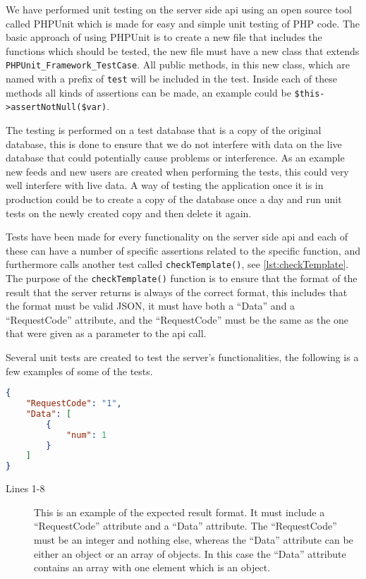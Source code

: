 We have performed unit testing on the server side \ac{api} using an open source tool called PHPUnit which is made for easy and simple unit testing of PHP code. The basic approach of using PHPUnit is to create a new file that includes the functions which should be tested, the new file must have a new class that extends \lstinline|PHPUnit_Framework_TestCase|. All public methods, in this new class, which are named with a prefix of \lstinline|test| will be included in the test. Inside each of these methods all kinds of assertions can be made, an example could be \lstinline|$this->assertNotNull($var)|\citep{phpunit}.

The testing is performed on a test database that is a copy of the original database, this is done to ensure that we do not interfere with data on the live database that could potentially cause problems or interference. As an example new feeds and new users are created when performing the tests, this could very well interfere with live data. A way of testing the application once it is in production could be to create a copy of the database once a day and run unit tests on the newly created copy and then delete it again.

Tests have been made for every functionality on the server side \ac{api} and each of these can have a number of specific assertions related to the specific function, and furthermore calls another test called \lstinline|checkTemplate()|, see \autoref{lst:checkTemplate}. The purpose of the \lstinline|checkTemplate()| function is to ensure that the format of the result that the server returns is always of the correct format, this includes that the format must be valid JSON, it must have both a ``Data'' and a ``RequestCode'' attribute, and the ``RequestCode'' must be the same as the one that were given as a parameter to the \ac{api} call.

Several unit tests are created to test the server's functionalities, the following is a few examples of some of the tests.

\begin{lstlisting}[language=json, label=lst:jsonFormat, caption={JSON format, in this case an example of the result from \lstinline|CheckFeeds|}]
{
    "RequestCode": "1",
    "Data": [
        {
            "num": 1
        }
    ]
}
\end{lstlisting}
\begin{description}
\item[Lines 1-8] This is an example of the expected result format. It must include a ``RequestCode'' attribute and a ``Data'' attribute. The ``RequestCode'' must be an integer and nothing else, whereas the ``Data'' attribute can be either an object or an array of objects. In this case the ``Data'' attribute contains an array with one element which is an object.
\end{description}

